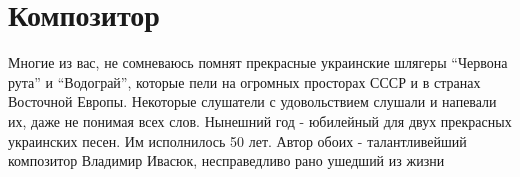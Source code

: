  
 
 
 
 
\chapter{Композитор}

Многие из вас, не сомневаюсь помнят прекрасные украинские шлягеры \enquote{Червона
рута} и \enquote{Водограй}, которые пели на огромных просторах СССР и в странах
Восточной Европы. Некоторые слушатели с удовольствием слушали и напевали их,
даже не понимая всех слов.  Нынешний год - юбилейный для двух прекрасных
украинских песен. Им исполнилось 50 лет. Автор обоих - талантливейший
композитор Владимир Ивасюк, несправедливо рано ушедший из жизни 
